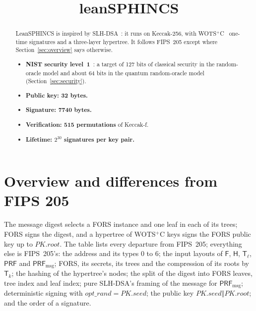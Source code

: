 \documentclass[11pt]{article}
\title{leanSPHINCS}
\author{}
\date{}
\newcommand{\PRF}{\mathsf{PRF}}
\newcommand{\PRFmsg}{\mathsf{PRF}_{\mathrm{msg}}}
\newcommand{\concat}{\mathbin\Vert}
\newcommand{\pkseed}{\mathit{PK.seed}}
\newcommand{\pkroot}{\mathit{PK.root}}
\begin{document}
\maketitle

\begin{abstract}

LeanSPHINCS is inspired by SLH-DSA~\cite{FIPS205}: it runs on Keccak-256, with WOTS$^+$C~\cite{HK22C} one-time signatures and a three-layer hypertree. It follows FIPS~205 except where Section~\ref{sec:overview} says otherwise.

\begin{itemize}
  \item \textbf{NIST security level~1}~\cite{NISTPQC}: a target of 127 bits of classical security in the random-oracle model and about 64 bits in the quantum random-oracle model (Section~\ref{sec:security}).
  \item \textbf{Public key: 32 bytes.}
  \item \textbf{Signature: 7740 bytes.}
  \item \textbf{Verification: 515 permutations} of Keccak-f.
  \item \textbf{Lifetime: $2^{30}$ signatures per key pair.}
\end{itemize}
\end{abstract}

\section{Overview and differences from FIPS 205}
\label{sec:overview}

The message digest selects a FORS instance and one leaf in each of its trees; FORS signs the digest, and a hypertree of WOTS$^+$C keys signs the FORS public key up to $\pkroot$. The table lists every departure from FIPS~205; everything else is FIPS~205's: the address and its types $0$ to $6$; the input layouts of $\mathsf F$, $\mathsf H$, $\mathsf T_\ell$, $\PRF$ and $\PRFmsg$; FORS, its secrets, its trees and the compression of its roots by $\mathsf T_k$; the hashing of the hypertree's nodes; the split of the digest into FORS leaves, tree index and leaf index; pure SLH-DSA's framing of the message for $\PRFmsg$; deterministic signing with $\mathit{opt\_rand}=\pkseed$; the public key $\pkseed\concat\pkroot$; and the order of a signature.
\end{document}
